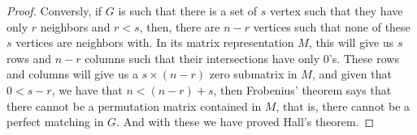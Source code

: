 \begin{proof}
        Conversly, if $G$ is such that there is a set of $s$ vertex such that they have only $r$ neighbors and $r < s$, then, there are $n - r$
        vertices such that none of these $s$ vertices are neighbors with. In its matrix representation $M$, this will give us $s$ rows and $n - r$
        columns such that their intersections have only $0$'s. These rows and columns will give us a $s \times (n - r)$ zero submatrix in $M$, and
        given that $0 < s - r$, we have that $n < (n - r) + s$, then Frobenius' theorem says that there cannot be a permutation matrix contained in 
        $M$, that is, there cannot be a perfect matching in $G$. And with these we have proved Hall's theorem.
    \end{proof}